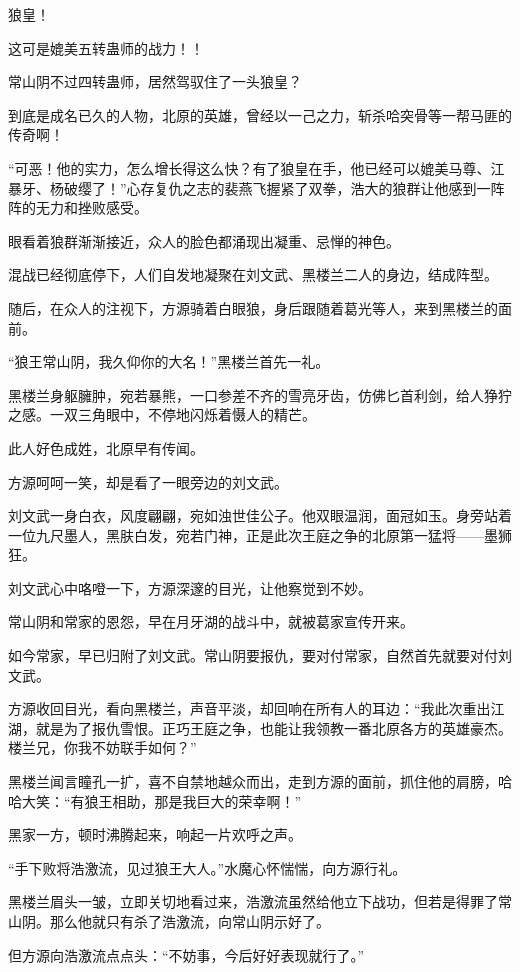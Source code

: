 \begin{this_body}
狼皇！

这可是媲美五转蛊师的战力！！

常山阴不过四转蛊师，居然驾驭住了一头狼皇？

到底是成名已久的人物，北原的英雄，曾经以一己之力，斩杀哈突骨等一帮马匪的传奇啊！

“可恶！他的实力，怎么增长得这么快？有了狼皇在手，他已经可以媲美马尊、江暴牙、杨破缨了！”心存复仇之志的裴燕飞握紧了双拳，浩大的狼群让他感到一阵阵的无力和挫败感受。

眼看着狼群渐渐接近，众人的脸色都涌现出凝重、忌惮的神色。

混战已经彻底停下，人们自发地凝聚在刘文武、黑楼兰二人的身边，结成阵型。

随后，在众人的注视下，方源骑着白眼狼，身后跟随着葛光等人，来到黑楼兰的面前。

“狼王常山阴，我久仰你的大名！”黑楼兰首先一礼。

黑楼兰身躯臃肿，宛若暴熊，一口参差不齐的雪亮牙齿，仿佛匕首利剑，给人狰狞之感。一双三角眼中，不停地闪烁着慑人的精芒。

此人好色成姓，北原早有传闻。

方源呵呵一笑，却是看了一眼旁边的刘文武。

刘文武一身白衣，风度翩翩，宛如浊世佳公子。他双眼温润，面冠如玉。身旁站着一位九尺墨人，黑肤白发，宛若门神，正是此次王庭之争的北原第一猛将——墨狮狂。

刘文武心中咯噔一下，方源深邃的目光，让他察觉到不妙。

常山阴和常家的恩怨，早在月牙湖的战斗中，就被葛家宣传开来。

如今常家，早已归附了刘文武。常山阴要报仇，要对付常家，自然首先就要对付刘文武。

方源收回目光，看向黑楼兰，声音平淡，却回响在所有人的耳边：“我此次重出江湖，就是为了报仇雪恨。正巧王庭之争，也能让我领教一番北原各方的英雄豪杰。楼兰兄，你我不妨联手如何？”

黑楼兰闻言瞳孔一扩，喜不自禁地越众而出，走到方源的面前，抓住他的肩膀，哈哈大笑：“有狼王相助，那是我巨大的荣幸啊！”

黑家一方，顿时沸腾起来，响起一片欢呼之声。

“手下败将浩激流，见过狼王大人。”水魔心怀惴惴，向方源行礼。

黑楼兰眉头一皱，立即关切地看过来，浩激流虽然给他立下战功，但若是得罪了常山阴。那么他就只有杀了浩激流，向常山阴示好了。

但方源向浩激流点点头：“不妨事，今后好好表现就行了。”


\end{this_body}
